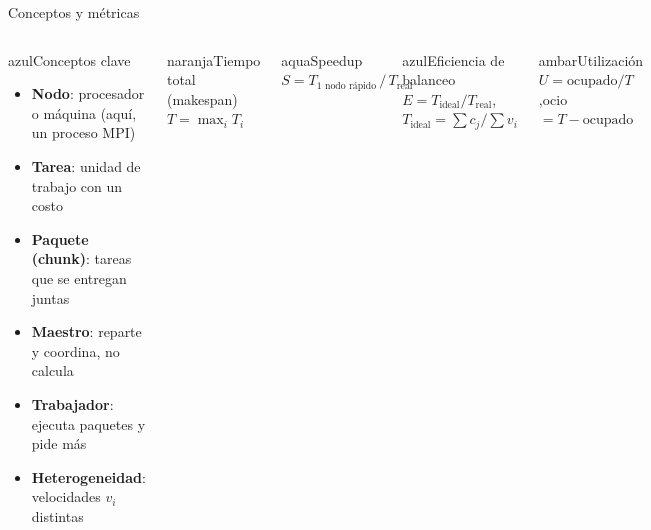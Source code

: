 \documentclass[aspectratio=169,11pt,t]{beamer}
\begin{document}
\begin{frame}{Conceptos y métricas}
\begin{columns}[T,onlytextwidth]
\begin{tarjeta}[]{azul}{Conceptos clave}
\begin{itemize}\setlength\itemsep{2pt}\footnotesize
\item \textbf{Nodo}: procesador o máquina (aquí, un proceso MPI)
\item \textbf{Tarea}: unidad de trabajo con un costo
\item \textbf{Paquete (chunk)}: tareas que se entregan juntas
\item \textbf{Maestro}: reparte y coordina, no calcula
\item \textbf{Trabajador}: ejecuta paquetes y pide más
\item \textbf{Heterogeneidad}: velocidades $v_i$ distintas
\end{itemize}
\end{tarjeta}
\begin{tarjeta}[height=.95cm]{naranja}{Tiempo total (makespan)}
\small $T=\max_i T_i$
\end{tarjeta}\vspace{1pt}
\begin{tarjeta}[height=.95cm]{aqua}{Speedup}
\small $S=T_{\text{1 nodo rápido}}\,/\,T_{\text{real}}$
\end{tarjeta}\vspace{1pt}
\begin{tarjeta}[height=.95cm]{azul}{Eficiencia de balanceo}
\small $E=T_{\text{ideal}}/T_{\text{real}}$,\quad $T_{\text{ideal}}=\sum c_j/\sum v_i$
\end{tarjeta}\vspace{1pt}
\begin{tarjeta}[height=.95cm]{ambar}{Utilización}
\small $U=\text{ocupado}/T$,\quad ocio $=T-\text{ocupado}$
\end{tarjeta}
\end{columns}
\end{frame}
\end{document}
